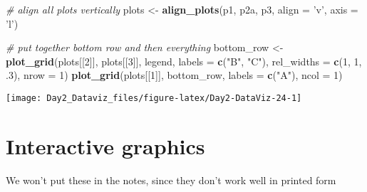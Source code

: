\documentclass[12pt,letterpaperpaper,openany]{book}
\newenvironment{Shaded}{\begin{snugshade}}{\end{snugshade}}
\newcommand{\CommentTok}[1]{\textcolor[rgb]{0.56,0.35,0.01}{\textit{#1}}}
\newcommand{\DataTypeTok}[1]{\textcolor[rgb]{0.13,0.29,0.53}{#1}}
\newcommand{\DecValTok}[1]{\textcolor[rgb]{0.00,0.00,0.81}{#1}}
\newcommand{\FloatTok}[1]{\textcolor[rgb]{0.00,0.00,0.81}{#1}}
\newcommand{\KeywordTok}[1]{\textcolor[rgb]{0.13,0.29,0.53}{\textbf{#1}}}
\newcommand{\NormalTok}[1]{#1}
\newcommand{\StringTok}[1]{\textcolor[rgb]{0.31,0.60,0.02}{#1}}
\begin{document}
\begin{Shaded}
\begin{Highlighting}[]
\CommentTok{# align all plots vertically}
\NormalTok{plots <-}\StringTok{ }\KeywordTok{align_plots}\NormalTok{(p1, p2a, p3, }\DataTypeTok{align =} \StringTok{'v'}\NormalTok{, }\DataTypeTok{axis =} \StringTok{'l'}\NormalTok{)}

\CommentTok{# put together bottom row and then everything}
\NormalTok{bottom_row <-}\StringTok{ }\KeywordTok{plot_grid}\NormalTok{(plots[[}\DecValTok{2}\NormalTok{]], plots[[}\DecValTok{3}\NormalTok{]], legend, }\DataTypeTok{labels =} \KeywordTok{c}\NormalTok{(}\StringTok{"B"}\NormalTok{, }\StringTok{"C"}\NormalTok{), }\DataTypeTok{rel_widths =} \KeywordTok{c}\NormalTok{(}\DecValTok{1}\NormalTok{, }\DecValTok{1}\NormalTok{, }\FloatTok{.3}\NormalTok{), }\DataTypeTok{nrow =} \DecValTok{1}\NormalTok{)}
\KeywordTok{plot_grid}\NormalTok{(plots[[}\DecValTok{1}\NormalTok{]], bottom_row, }\DataTypeTok{labels =} \KeywordTok{c}\NormalTok{(}\StringTok{"A"}\NormalTok{), }\DataTypeTok{ncol =} \DecValTok{1}\NormalTok{)}
\end{Highlighting}
\end{Shaded}

\texttt{[image: Day2\_Dataviz\_files/figure-latex/Day2-DataViz-24-1]}

\begin{Shaded}
\end{Shaded}

\hypertarget{interactive}{%
\section{Interactive graphics}\label{interactive}}

We won't put these in the notes, since they don't work well in printed form
\end{document}
